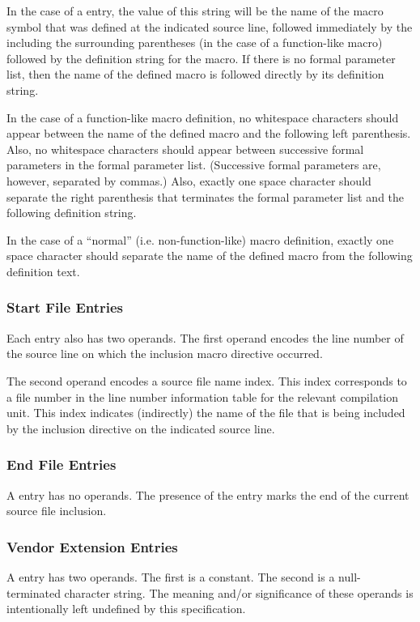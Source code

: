 In the case of a  entry, the value of this
string will be the name of the macro symbol that was defined
at the indicated source line, followed immediately by the 
including the surrounding parentheses (in
the case of a function-like macro) followed by the definition
string for the macro. If there is no formal parameter list,
then the name of the defined macro is followed directly by
its definition string.

In the case of a function-like macro definition, no whitespace
characters should appear between the name of the defined
macro and the following left parenthesis. Also, no whitespace
characters should appear between successive formal parameters
in the formal parameter list. (Successive formal parameters
are, however, separated by commas.) Also, exactly one space
character should separate the right parenthesis that terminates
the formal parameter list and the following definition string.

In the case of a ``normal'' (i.e. non-function-like) macro
definition, exactly one space character should separate the
name of the defined macro from the following definition text.



\subsubsection{Start File Entries}
\label{chap:startfileentries}
Each  entry also has two operands. The
first operand encodes the line number of the source line on
which the inclusion macro directive occurred.

The second operand encodes a source file name index. This index
corresponds to a file number in the line number information
table for the relevant compilation unit. This index indicates
(indirectly) the name of the file that is being included by
the inclusion directive on the indicated source line.

\subsubsection{End File Entries}
\label{chap:endfileentries}
A  entry has no operands. The presence of
the entry marks the end of the current source file inclusion.

\subsubsection{Vendor Extension Entries}
\label{chap:vendorextensionentries}
A  entry has two operands. The first
is a constant. The second is a null-terminated character
string. The meaning and/or significance of these operands is
intentionally left undefined by this specification.


